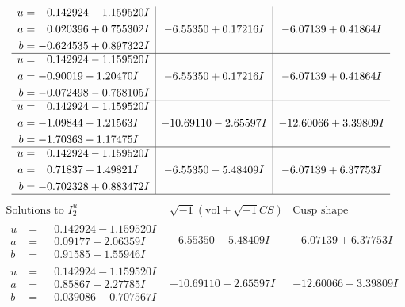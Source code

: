 \documentclass[1p]{elsarticle_modified}
\theoremstyle{definition}
\newcommand{\I}{\sqrt{-1}}
\begin{document}
$$\begin{array}{c|c|c}
\begin{aligned}
u &= \phantom{-}0.142924 - 1.159520 I \\
a &= \phantom{-}0.020396 + 0.755302 I \\
b &= -0.624535 + 0.897322 I\end{aligned}
 & -6.55350 + 0.17216 I & -6.07139 + 0.41864 I \\ \hline\begin{aligned}
u &= \phantom{-}0.142924 - 1.159520 I \\
a &= -0.90019 - 1.20470 I \\
b &= -0.072498 - 0.768105 I\end{aligned}
 & -6.55350 + 0.17216 I & -6.07139 + 0.41864 I \\ \hline\begin{aligned}
u &= \phantom{-}0.142924 - 1.159520 I \\
a &= -1.09844 - 1.21563 I \\
b &= -1.70363 - 1.17475 I\end{aligned}
 & -10.69110 - 2.65597 I & -12.60066 + 3.39809 I \\ \hline\begin{aligned}
u &= \phantom{-}0.142924 - 1.159520 I \\
a &= \phantom{-}0.71837 + 1.49821 I \\
b &= -0.702328 + 0.883472 I\end{aligned}
 & -6.55350 - 5.48409 I & -6.07139 + 6.37753 I\\
 \hline 
 \end{array}$$\newpage$$\begin{array}{c|c|c}  
\text{Solutions to }I^u_{2}& \I (\text{vol} + \sqrt{-1}CS) & \text{Cusp shape}\\
 \hline 
\begin{aligned}
u &= \phantom{-}0.142924 - 1.159520 I \\
a &= \phantom{-}0.09177 - 2.06359 I \\
b &= \phantom{-}0.91585 - 1.55946 I\end{aligned}
 & -6.55350 - 5.48409 I & -6.07139 + 6.37753 I \\ \hline\begin{aligned}
u &= \phantom{-}0.142924 - 1.159520 I \\
a &= \phantom{-}0.85867 - 2.27785 I \\
b &= \phantom{-}0.039086 - 0.707567 I\end{aligned}
 & -10.69110 - 2.65597 I & -12.60066 + 3.39809 I \\ \hline\begin{aligned}

\end{aligned}
\end{array}$$
\end{document}
